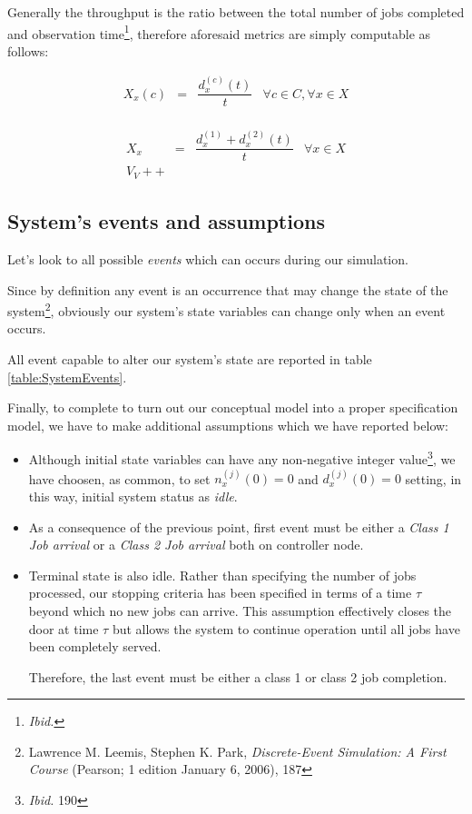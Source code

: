 \documentclass[10pt,a4paper]{article}
\begin{document}
Generally the throughput is the ratio between the total number of jobs completed and observation time\footnote{\textit{Ibid.}}, therefore aforesaid metrics are simply computable as follows:

\begin{equation}
\begin{array} {rccr} 
X_x(c) & = & \displaystyle \dfrac{d_x^{(c)}(t)}{t} & \forall c \in C, \forall x \in X \\
\end{array}
\end{equation}

\begin{equation}
\begin{array} {rccr} 
X_x & = & \displaystyle \dfrac{d_x^{(1)} + d_x^{(2)}(t)}{t} & \forall x \in X \\
V_V++
\end{array}
\end{equation}

\subsection{System's events and assumptions}

Let's look to all possible \textit{events} which can occurs during our simulation. 

Since by definition any event is an occurrence that may change the state of the system\footnote{Lawrence M. Leemis, Stephen K. Park, \textit{Discrete-Event Simulation: A First Course} (Pearson; 1 edition January 6, 2006), 187}, obviously our system's state variables can change only when an event occurs.

All event capable to alter our system's state are reported in table \ref{table:SystemEvents}.

Finally, to complete to turn out our conceptual model into a proper specification model, we have to make additional assumptions which we have reported below:

\begin{itemize}
\item Although initial state variables can have any non-negative integer value\footnote{\textit{Ibid.} 190}, we have choosen, as common, to set $n_x^{(j)}(0) = 0$ and $d_x^{(j)}(0) = 0$ setting, in this way, initial system status as \textit{idle}. 

\item As a consequence of the previous point, first event must be either a \textit{Class 1 Job arrival} or a
\textit{Class 2 Job arrival} both on controller node.

\item Terminal state is also idle. Rather than specifying the number of jobs processed, our stopping criteria has been specified in terms of a time $\tau$ beyond which no new jobs can arrive. This assumption effectively closes the door at time $\tau$ but allows the system to continue operation until all jobs have been completely served. 

Therefore, the last event must be either a class 1 or class 2 job completion.
\end{itemize}
\end{document}
